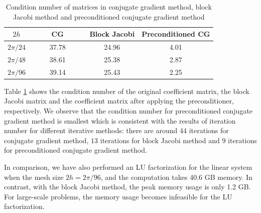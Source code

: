 \begin{table}[htbp]
	\begin{center}
		\begin{tabular}{|c|c c c|}
			\hline
			$2h$   & ~~~~ CG ~~~~& Block Jacobi & Preconditioned CG  \\
			\hline
			$2\pi/24$ &37.78& 24.96& 4.01\\
			\hline
			$2\pi/48$ &38.61 & 25.38 & 2.87\\
			\hline 
			$2\pi/96$ &39.14 &25.43 & 2.25\\
			\hline
		\end{tabular}
	\end{center}
	\caption{Condition number of matrices in conjugate gradient method, block Jacobi method and preconditioned conjugate gradient method}\label{condition_number}
\end{table} 
Table \ref{condition_number} shows the condition number of the original coefficient matrix, the block Jacobi matrix and the coefficient matrix after applying the preconditioner, respectively. We observe that the condition number for preconditioned conjugate gradient method is smallest which is consistent with the results of iteration number for different iterative methods: there are around $44$ iterations for conjugate gradient method, $13$ iterations for block Jacobi method and $9$ iterations for preconditioned conjugate gradient method.

In comparison, we have also performed an LU factorization for the linear system when the mesh size $2h = 2\pi/96$, and the computation takes 40.6 GB memory. In contrast, with the block Jacobi method, the peak memory usage is only 1.2 GB. For large-scale problems, the memory usage becomes infeasible for the LU factorization. 

